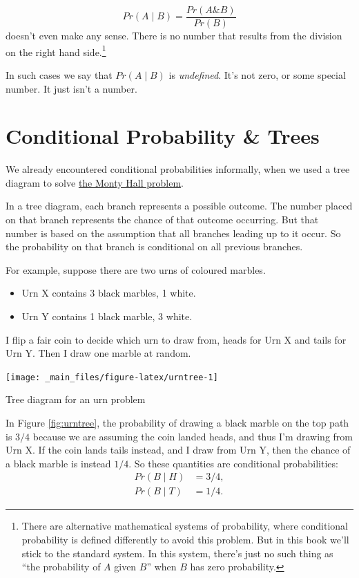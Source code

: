 \documentclass[justified]{tufte-book}
\providecommand{\tightlist}{%
  \setlength{\itemsep}{0pt}\setlength{\parskip}{0pt}}
\newcommand{\given}{\mid}
\renewcommand{\wedge}{\mathbin{\&}}
\newcommand{\p}{Pr}
\theoremstyle{definition}
\theoremstyle{definition}
\theoremstyle{definition}
\theoremstyle{definition}
\theoremstyle{remark}
\begin{document}
\[ \p(A \given B) = \frac{\p(A \wedge B)}{\p(B)} \]
doesn't even make any sense. There is no number that results from the division on the right hand side.\footnote{There are alternative mathematical systems of probability, where conditional probability is defined differently to avoid this problem. But in this book we'll stick to the standard system. In this system, there's just no such thing as ``the probability of \(A\) given \(B\)'' when \(B\) has zero probability.}

In such cases we say that \(\p(A \given B)\) is \emph{undefined}. It's not zero, or some special number. It just isn't a number.

\hypertarget{conditional-probability-trees}{%
\section{Conditional Probability \& Trees}\label{conditional-probability-trees}}

We already encountered conditional probabilities informally, when we used a tree diagram to solve \protect\hyperlink{the-monty-hall-problem}{the Monty Hall problem}.

In a tree diagram, each branch represents a possible outcome. The number placed on that branch represents the chance of that outcome occurring. But that number is based on the assumption that all branches leading up to it occur. So the probability on that branch is conditional on all previous branches.

For example, suppose there are two urns of coloured marbles.

\begin{itemize}
\tightlist
\item
  Urn X contains 3 black marbles, 1 white.
\item
  Urn Y contains 1 black marble, 3 white.
\end{itemize}

I flip a fair coin to decide which urn to draw from, heads for Urn X and tails for Urn Y. Then I draw one marble at random.

\begin{marginfigure}
\texttt{[image: \_main\_files/figure-latex/urntree-1]} \caption[Tree diagram for an urn problem]{Tree diagram for an urn problem}\label{fig:urntree}
\end{marginfigure}

In Figure \ref{fig:urntree}, the probability of drawing a black marble on the top path is \(3/4\) because we are assuming the coin landed heads, and thus I'm drawing from Urn X. If the coin lands tails instead, and I draw from Urn Y, then the chance of a black marble is instead \(1/4\). So these quantities are conditional probabilities:
\[
  \begin{aligned}
    \p(B \given H) &= 3/4,\\
    \p(B \given T) &= 1/4.
  \end{aligned}
\]
\end{document}
